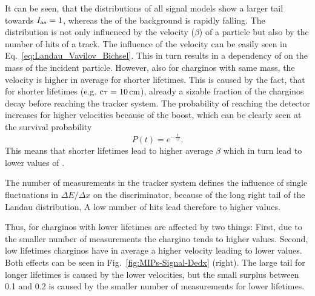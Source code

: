 It can be seen, that the \ias distributions of all signal models show a larger tail towards $I_{\text{as}}=1$, whereas the \ias of the background is rapidly falling.
The \ias distribution is not only influenced by the velocity ($\beta$) of a particle but also by the number of hits of a track.
The influence of the velocity can be easily seen in Eq.~\ref{eq:Landau_Vavilov_Bichsel}. 
This in turn results in a dependency of \ias on the mass of the incident particle.
However, also for charginos with same mass, the velocity is higher in average for shorter lifetimes.
This is caused by the fact, that for shorter lifetimes (e.g. $\text{c}\tau=10\,\text{cm}$), already a sizable fraction of the charginos decay before reaching the tracker system.
The probability of reaching the detector increases for higher velocities because of the boost, which can be clearly seen at the survival probability
\begin{equation}
P \left( t \right) = e^{-\frac{t}{\gamma \tau}}.
\end{equation} 
This means that shorter lifetimes lead to higher average $\beta$ which in turn lead to lower values of \ias.

The number of measurements in the tracker system defines the influence of single fluctuations in $\Delta E/\Delta x$ on the \ias discriminator, because of the long right tail of the Landau distribution, A low number of hits lead therefore to higher \ias values.

Thus, \ias for charginos with lower lifetimes are affected by two things: 
First, due to the smaller number of measurements the chargino tends to higher \ias values.
Second, low lifetimes charginos have in average a higher velocity leading to lower \ias values.
Both effects can be seen in Fig.~\ref{fig:MIPs-Signal-Dedx} (right).
The large tail for longer lifetimes is caused by the lower velocities, but the small surplus between 0.1 and 0.2 is caused by the smaller number of measurements for lower lifetimes.\\


